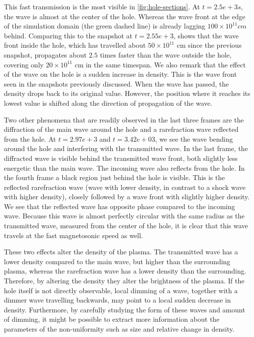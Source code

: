 This fast transmission is the most visible in \cref{fig:hole-sections}. 
At $t=2.5e+3 s$, the wave is almost at the center of the hole. Whereas the wave front at the edge of the simulation domain (the green dashed line) is already lagging $100\times10^{11} cm$ behind.
Comparing this to the snapshot at $t=2.55e+3$, shows that the wave front inside the hole, which has travelled about $50\times10^{11}$ cm since the previous snapshot, propagates about $2.5$ times faster than the wave outside the hole, covering only $20\times10^{11}$ cm in the same timespan.
We also remark that the effect of the wave on the hole is a sudden increase in density. This is the wave front seen in the snapshots previously discussed.
When the wave has passed, the density drops back to its original value. However, the position where it reaches its lowest value is shifted along the direction of propagation of the wave.

Two other phenomena that are readily observed in the last three frames are the diffraction of the main wave around the hole and a rarefraction wave reflected from the hole.
At $t=2.97e+3$ and $t=3.42e+03$, we see the wave bending around the hole and interfering with the transmitted wave.
In the last frame, the diffracted wave is visible behind the transmitted wave front, both slightly less energetic than the main wave.
The incoming wave also reflects from the hole.
In the fourth frame a black region just behind the hole is visible. This is the reflected rarefraction wave (wave with lower density, in contrast to a shock wave with higher density), closely followed by a wave front with slightly higher density.
We see that the reflected wave has opposite phase compared to the incoming wave.
Because this wave is almost perfectly circular with the same radius as the transmitted wave, measured from the center of the hole, it is clear that this wave travels at the fast magnetosonic speed as well.

These two effects alter the density of the plasma. The transmitted wave has a lower density compared to the main wave, but higher than the surrounding plasma, whereas the rarefraction wave has a lower density than the surrounding.
Therefore, by altering the density they alter the brightness of the plasma. 
If the hole itself is not directly observable, local dimming of a wave, together with a dimmer wave travelling backwards, may point to a local sudden decrease in density.
Furthermore, by carefully studying the form of these waves and amount of dimming, it might be possible to extract more information about the parameters of the non-uniformity such as size and relative change in density.

